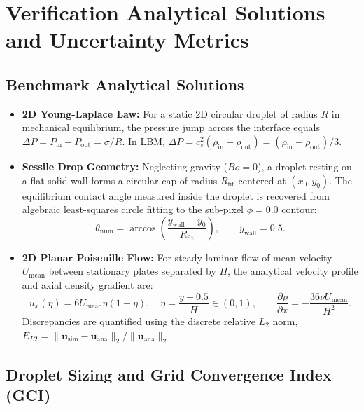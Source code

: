 \documentclass[11pt,a4paper]{article}
\begin{document}
\section{Verification Analytical Solutions and Uncertainty Metrics}
\label{app:vv}

\subsection{Benchmark Analytical Solutions}

\begin{itemize}
    \item \textbf{2D Young-Laplace Law:} For a static 2D circular droplet of radius $R$ in mechanical equilibrium, the pressure jump across the interface equals $\Delta P = P_{\mathrm{in}} - P_{\mathrm{out}} = \sigma / R$. In LBM, $\Delta P = c_s^2 (\rho_{\mathrm{in}} - \rho_{\mathrm{out}}) = (\rho_{\mathrm{in}} - \rho_{\mathrm{out}})/3$.
    \item \textbf{Sessile Drop Geometry:} Neglecting gravity ($Bo = 0$), a droplet resting on a flat solid wall forms a circular cap of radius $R_{\mathrm{fit}}$ centered at $(x_0, y_0)$. The equilibrium contact angle measured inside the droplet is recovered from algebraic least-squares circle fitting to the sub-pixel $\phi = 0.0$ contour:
    \begin{equation}
        \theta_{\mathrm{num}} = \arccos\left( \frac{y_{\mathrm{wall}} - y_0}{R_{\mathrm{fit}}} \right), \qquad y_{\mathrm{wall}} = 0.5.
    \end{equation}
    \item \textbf{2D Planar Poiseuille Flow:} For steady laminar flow of mean velocity $U_{\mathrm{mean}}$ between stationary plates separated by $H$, the analytical velocity profile and axial density gradient are:
    \begin{equation}
        u_x(\eta) = 6 U_{\mathrm{mean}} \eta (1 - \eta), \quad \eta = \frac{y - 0.5}{H} \in (0, 1), \qquad \frac{\partial \rho}{\partial x} = -\frac{36 \nu U_{\mathrm{mean}}}{H^2}.
    \end{equation}
    Discrepancies are quantified using the discrete relative $L_2$ norm, $E_{L2} = \|\mathbf{u}_{\mathrm{sim}} - \mathbf{u}_{\mathrm{ana}}\|_2 / \|\mathbf{u}_{\mathrm{ana}}\|_2$.
\end{itemize}

\subsection{Droplet Sizing and Grid Convergence Index (GCI)}
\end{document}
